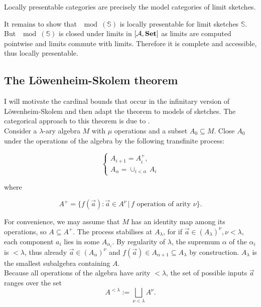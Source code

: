 \begin{Corollary}
Locally presentable categories are precisely the model categories of limit sketches.
\end{Corollary}
\begin{Proof}
It remains to show that $\mod(\mathbb S)$ is locally presentable for limit sketches $\mathbb S$. But $\mod(\mathbb S)$ is closed under limits in $[\mathcal{A},\mathbf{Set}]$ as limits are computed pointwise and limits commute with limits. Therefore it is complete and accessible, thus locally presentable.
\end{Proof}

\subsection{The Löwenheim-Skolem theorem}

I will motivate the cardinal bounds that occur in the infinitary version of Löwenheim-Skolem and then adapt the theorem to models of sketches. The categorical approach to this theorem is due to \cite[§3.3]{MakkaiPare}. \\

Consider a $\lambda$-ary algebra $M$ with $\mu$ operations and a subset $A_0 \subseteq M$. Close $A_0$ under the operations of the algebra by the following transfinite process:

\[
\begin{cases}
A_{i+1} = A_i^+, \\
A_{\alpha} = \cup_{i < \alpha}\,A_i
\end{cases}
\]

where

\[ A^+ = \{ f(\vec a) : \vec a \in A^\nu \, | \, f \text{ operation of arity } \nu \}. \] 

For convenience, we may assume that $M$ has an identity map among its operations, so $A \subseteq A^+$. The process stabilises at $A_\lambda$, for if $\vec a \in (A_\lambda)^\nu, \nu < \lambda$, each component $a_i$ lies in some $A_{\alpha_i}$. By regularity of $\lambda$, the supremum $\alpha$ of the $\alpha_i$ is $< \lambda$, thus already $\vec a \in (A_\alpha)^\nu$ and $f(\vec a) \in A_{\alpha+1} \subseteq A_\lambda$ by construction. $A_\lambda$ is the smallest subalgebra containing $A$. \\

Because all operations of the algebra have arity $< \lambda$, the set of possible inputs $\vec a$ ranges over the set
\[ A^{< \lambda} := \bigsqcup_{\nu < \lambda} A^\nu. \]

